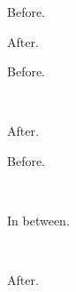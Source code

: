 \documentclass{article}
\begin{document}
\noindent Before.
\begin{AgdaMultiCode}{2}
\begin{code}[hide]%
%
\>[2]\<%
\end{code}
\begin{code}%
\>[2][@{}l@{\AgdaIndent{1}}]%
\>[4]%
\>[9]\AgdaSymbol{:}\AgdaSpace{}%
\<%
\end{code}
\begin{code}%
%
\>[4]%
\>[9]\AgdaSymbol{:}\AgdaSpace{}%
\<%
\end{code}
\end{AgdaMultiCode}
After.

\noindent Before.
\begin{AgdaAlign}
\begin{code}%
%
\>[2]\<%
\\
\>[2][@{}l@{\AgdaIndent{0}}]%
\>[4]\AgdaSpace{}%
\AgdaSymbol{:}\AgdaSpace{}%
\<%
\end{code}
\begin{code}[hide]%
%
\>[4]\AgdaSpace{}%
\AgdaSymbol{:}\AgdaSpace{}%
\<%
\end{code}
\begin{code}%
%
\>[4]\AgdaSpace{}%
\AgdaSymbol{:}\AgdaSpace{}%
\<%
\end{code}
\end{AgdaAlign}
After.

\noindent Before.
\begin{AgdaAlign}
\begin{code}%
%
\>[2]\<%
\\
\>[2][@{}l@{\AgdaIndent{0}}]%
\>[4]\AgdaSpace{}%
\AgdaSymbol{:}\AgdaSpace{}%
\<%
\end{code}
In between.
\begin{AgdaSuppressSpace}{2}
\begin{code}%
%
\>[2]\<%
\\
\>[2][@{}l@{\AgdaIndent{0}}]%
\>[4]\AgdaSpace{}%
\AgdaSymbol{:}\AgdaSpace{}%
\<%
\end{code}
\begin{code}[hide]%
%
\>[2]\<%
\end{code}
\begin{code}%
\>[2][@{}l@{\AgdaIndent{1}}]%
\>[4]\AgdaSpace{}%
\AgdaSymbol{:}\AgdaSpace{}%
\<%
\end{code}
\end{AgdaSuppressSpace}
\end{AgdaAlign}
After.
\end{document}
